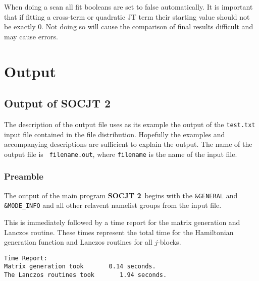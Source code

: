 \documentclass{article}
\newcommand{\JT}{Jahn-Teller\ }
\newcommand{\socjttwo}{{\bf SOCJT 2}}
\begin{document}
When doing a scan all fit booleans are set to false automatically. It is important
that if fitting a cross-term or quadratic JT term their starting value should not
be exactly 0. Not doing so will cause the comparison of final results difficult and may
cause errors.

\section{Output} \label{section:output}

\subsection{Output of \socjttwo }

The description of the output file uses as its example the output of
the {\tt test.txt} input file contained in the file
distribution. Hopefully the examples and accompanying descriptions are
sufficient to explain the output. The name of the output file is {\tt
  filename.out}, where {\tt filename} is the name of the input file.

\subsubsection{Preamble}

The output of the main program \socjttwo\ begins with the {\tt \&GENERAL} and {\tt \&MODE\_INFO} and all other relavent namelist groups
from the input file. 

This is immediately followed by a time report for the matrix generation and Lanczos routine. These times represent the total time for the Hamiltonian generation function and Lanczos routines for all $j$-blocks.

\begin{verbatim}
Time Report:
Matrix generation took       0.14 seconds.
The Lanczos routines took       1.94 seconds.
\end{verbatim}


\end{document}
